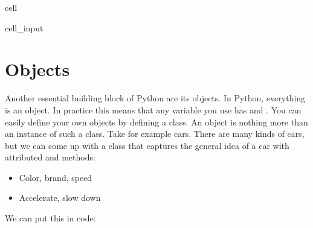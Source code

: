 \documentclass[letterpaper,10pt,english]{jupyterBook}
\begin{document}
\begin{sphinxuseclass}{cell}\begin{sphinxVerbatimInput}

\begin{sphinxuseclass}{cell_input}
\begin{sphinxVerbatim}[commandchars=\\\{\}]
  

 
      

\end{sphinxVerbatim}

\end{sphinxuseclass}\end{sphinxVerbatimInput}

\end{sphinxuseclass}

\section{Objects}
\label{\detokenize{notebooks/Tutorial1_NumpySimpleITK/Tutorial1_NumpySimpleITK_student:objects}}
\sphinxAtStartPar
Another essential building block of Python are its objects. In Python, everything is an object. In practice this means that any variable you use has  and . You can easily define your own objects by defining a class. An object is nothing more than an instance of such a class. Take for example cars. There are many kinds of cars, but we can come up with a class that captures the general idea of a car with attributed and methods:
\begin{itemize}
\item {} 
\sphinxAtStartPar
{} Color, brand, speed

\item {} 
\sphinxAtStartPar
{} Accelerate, slow down

\end{itemize}

\sphinxAtStartPar
We can put this in code:
\end{document}
